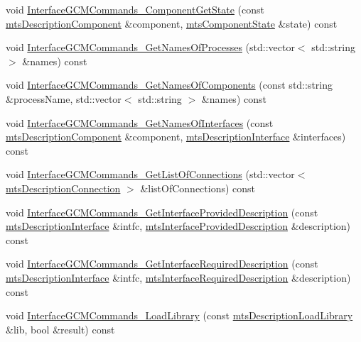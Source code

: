 \begin{DoxyCompactItemize}
\item 
void \hyperlink{classmts_manager_component_server_ae42ed223d038117a5588bcc640d162ab}{Interface\-G\-C\-M\-Commands\-\_\-\-Component\-Get\-State} (const \hyperlink{classmts_description_component}{mts\-Description\-Component} \&component, \hyperlink{classmts_component_state}{mts\-Component\-State} \&state) const 
\item 
void \hyperlink{classmts_manager_component_server_a82166415703899c3a250869bf8adbd59}{Interface\-G\-C\-M\-Commands\-\_\-\-Get\-Names\-Of\-Processes} (std\-::vector$<$ std\-::string $>$ \&names) const 
\item 
void \hyperlink{classmts_manager_component_server_abd512edd1f98f42ada757d78a113e57a}{Interface\-G\-C\-M\-Commands\-\_\-\-Get\-Names\-Of\-Components} (const std\-::string \&process\-Name, std\-::vector$<$ std\-::string $>$ \&names) const 
\item 
void \hyperlink{classmts_manager_component_server_ac67fcc9dd6ecc7205a783e2b5d31709c}{Interface\-G\-C\-M\-Commands\-\_\-\-Get\-Names\-Of\-Interfaces} (const \hyperlink{classmts_description_component}{mts\-Description\-Component} \&component, \hyperlink{classmts_description_interface}{mts\-Description\-Interface} \&interfaces) const 
\item 
void \hyperlink{classmts_manager_component_server_a343cbce6cf3d4e2af99e95af0ef0a9d7}{Interface\-G\-C\-M\-Commands\-\_\-\-Get\-List\-Of\-Connections} (std\-::vector$<$ \hyperlink{classmts_description_connection}{mts\-Description\-Connection} $>$ \&list\-Of\-Connections) const 
\item 
void \hyperlink{classmts_manager_component_server_a28987b940123ebebf65ede751021a6ec}{Interface\-G\-C\-M\-Commands\-\_\-\-Get\-Interface\-Provided\-Description} (const \hyperlink{classmts_description_interface}{mts\-Description\-Interface} \&intfc, \hyperlink{classmts_interface_provided_description}{mts\-Interface\-Provided\-Description} \&description) const 
\item 
void \hyperlink{classmts_manager_component_server_a44e58ed09a6b9c7b2caa977923ca9b1a}{Interface\-G\-C\-M\-Commands\-\_\-\-Get\-Interface\-Required\-Description} (const \hyperlink{classmts_description_interface}{mts\-Description\-Interface} \&intfc, \hyperlink{classmts_interface_required_description}{mts\-Interface\-Required\-Description} \&description) const 
\item 
void \hyperlink{classmts_manager_component_server_a973ef27b54522196c93567c11a4f4bf9}{Interface\-G\-C\-M\-Commands\-\_\-\-Load\-Library} (const \hyperlink{classmts_description_load_library}{mts\-Description\-Load\-Library} \&lib, bool \&result) const 

\end{DoxyCompactItemize}
